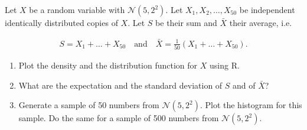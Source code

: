 
\begin{exercise}

Let $X$ be a random variable with $\mathcal{N}(5,2^2)$. Let $X_1,X_2,\dots,X_{50}$
be independent identically distributed copies of $X$. Let $S$ be their sum and $\bar{X}$
their average, i.e.

\begin{align*}
  S = X_1 + \dots + X_{50} \quad \text{and} \quad \bar{X} = \frac{1}{50}(X_1 + \dots + X_{50}).
\end{align*}

\begin{enumerate}[label = (\alph*)]
  \item Plot the density and the distribution function for $X$ using \textsc{R}.
  \item What are the expectation and the standard deviation of $S$ and of $\bar{X}$?
  \item Generate a sample of 50 numbers from $\mathcal{N}(5,2^2)$. Plot the histogram
  for this sample. Do the same for a sample of 500 numbers from $\mathcal{N}(5,2^2)$.
\end{enumerate}

\end{exercise}


